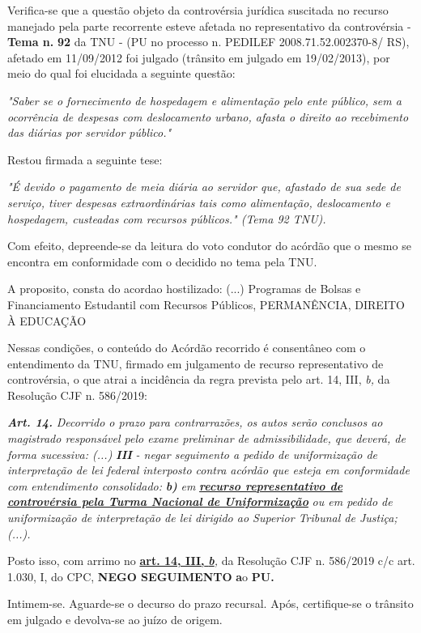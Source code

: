 \documentclass[12pt]{article}
\begin{document}
\justifying
\noindent Verifica-se que a questão objeto da controvérsia jurídica suscitada no recurso manejado pela parte recorrente esteve afetada no representativo da controvérsia - \textbf{Tema n. }\textbf{92} da TNU - (PU no processo n. PEDILEF 2008.71.52.002370-8/ RS),  afetado em 11/09/2012 foi julgado (trânsito em julgado em 19/02/2013), por meio do qual foi elucidada a seguinte questão:

\noindent \textit{"Saber se o fornecimento de hospedagem e alimentação pelo ente público, sem a ocorrência de despesas com deslocamento urbano, afasta o direito ao recebimento das diárias por servidor público."}

\noindent Restou firmada a seguinte tese:

\noindent \textit{"É devido o pagamento de meia diária ao servidor que, afastado de sua sede de serviço, tiver despesas extraordinárias tais como alimentação, deslocamento e hospedagem, custeadas com recursos públicos." (Tema 92 TNU).}

\noindent Com efeito, depreende-se da leitura do voto condutor do acórdão que o mesmo se encontra em conformidade com o decidido no  tema pela TNU.

\noindent A proposito, consta do acordao hostilizado: (...) Programas de Bolsas e Financiamento Estudantil com Recursos Públicos, PERMANÊNCIA, DIREITO À EDUCAÇÃO

\noindent Nessas condições, o conteúdo do Acórdão recorrido é consentâneo com o entendimento da TNU, firmado em julgamento de recurso representativo de controvérsia, o que atrai a incidência da regra prevista pelo art. 14, III, \textit{b,} da Resolução CJF n. 586/2019:

\noindent \textit{\textbf{Art. 14.}}\textit{ Decorrido o prazo para contrarrazões, os autos serão conclusos ao magistrado responsável pelo exame preliminar de admissibilidade, que deverá, de forma sucessiva: (...) }\textit{\textbf{III }}\textit{- negar seguimento a pedido de uniformização de interpretação de lei federal interposto contra acórdão que esteja em conformidade com entendimento consolidado: }\textit{\textbf{b)}}\textit{ em }\uline{\textit{\textbf{recurso representativo de controvérsia pela Turma Nacional de Uniformização}}}\textit{ ou em pedido de uniformização de interpretação de lei dirigido ao Superior Tribunal de Justiça;(...).}

\noindent Posto isso, com arrimo no \uline{\textbf{art. 14, III, }}\uline{\textit{\textbf{b}}}\textit{,} da Resolução CJF n. 586/2019 c/c art. 1.030, I, do CPC, \textbf{NEGO SEGUIMENTO }\textbf{a}o\textbf{ PU}\textbf{.}

\noindent Intimem-se. Aguarde-se o decurso do prazo recursal. Após, certifique-se o trânsito em julgado e devolva-se ao juízo de origem.
\end{document}
